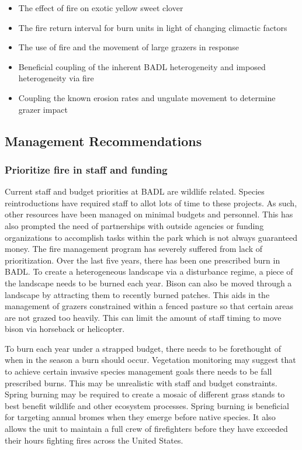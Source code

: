 \begin{itemize}
\item The effect of fire on exotic yellow sweet clover
\item The fire return interval for burn units in light of changing climactic factors
\item The use of fire and the movement of large grazers in response
\item Beneficial coupling of the inherent BADL heterogeneity and imposed   heterogeneity via fire
\item Coupling the known erosion rates and ungulate movement to determine  grazer impact
\end{itemize}

\subsection{Management Recommendations}

\subsubsection{Prioritize fire in staff and funding}

Current staff and budget priorities at BADL are wildlife related.
Species reintroductions have required staff to allot lots of time to these projects. 
As such, other resources have been managed on minimal budgets and personnel.
This has also prompted the need of partnerships with outside agencies or funding organizations to accomplish tasks within the park which is not always guaranteed money. 
The fire management program has severely suffered from lack of prioritization.
Over the last five years, there has been one prescribed burn in BADL. 
To create a heterogeneous landscape via a disturbance regime, a piece of the landscape needs to be burned each year. 
Bison can also be moved through a landscape by attracting them to recently burned patches. 
This aids in the management of grazers constrained within a fenced pasture so that certain areas are not grazed too heavily. 
This can limit the amount of staff timing to move bison via horseback or helicopter.

To burn each year under a strapped budget, there needs to be forethought of when in the season a burn should occur. 
Vegetation monitoring may suggest that to achieve certain invasive species management goals there needs to be fall prescribed burns. 
This may be unrealistic with staff and budget constraints. 
Spring burning may be required to create a mosaic of different grass stands to best benefit wildlife and other ecosystem processes. 
Spring burning is beneficial for targeting annual bromes when they emerge before native species. 
It also allows the unit to maintain a full crew of firefighters before they have exceeded their hours fighting fires across the United States.
